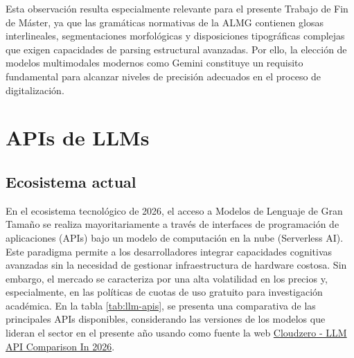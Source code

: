 Esta observación resulta especialmente relevante para el presente Trabajo de Fin de Máster, ya que las gramáticas normativas de la ALMG contienen glosas interlineales, segmentaciones morfológicas y disposiciones tipográficas complejas que exigen capacidades de parsing estructural avanzadas. Por ello, la elección de modelos multimodales modernos como Gemini constituye un requisito fundamental para alcanzar niveles de precisión adecuados en el proceso de digitalización.


\section{APIs de LLMs}

\subsection{ Ecosistema actual}
En el ecosistema tecnológico de 2026, el acceso a Modelos de Lenguaje de Gran Tamaño se realiza mayoritariamente a través de interfaces de programación de aplicaciones (APIs) bajo un modelo de computación en la nube (Serverless AI). Este paradigma permite a los desarrolladores integrar capacidades cognitivas avanzadas sin la necesidad de gestionar infraestructura de hardware costosa. Sin embargo, el mercado se caracteriza por una alta volatilidad en los precios y, especialmente, en las políticas de cuotas de uso gratuito para investigación académica.
En la tabla \ref{tab:llm-apis}, se presenta una comparativa de las principales APIs disponibles, considerando las versiones de los modelos que lideran el sector en el presente año usando como fuente la web \href{https://www.cloudzero.com/blog/llm-api-pricing-comparison/}{Cloudzero - LLM API Comparison In 2026}.



